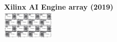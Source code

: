 \begin{frame}
{\begin{minipage}{0.30\linewidth}
\begin{center}
        {\bf Xilinx AI Engine array (2019)}\\
        \includegraphics[width=2.5cm]{./images/exascale/Xilinx-AI-Engine-Array}
      \end{center}
    \end{minipage}
  }
  
  
  
  
  
  
  
\end{frame}

